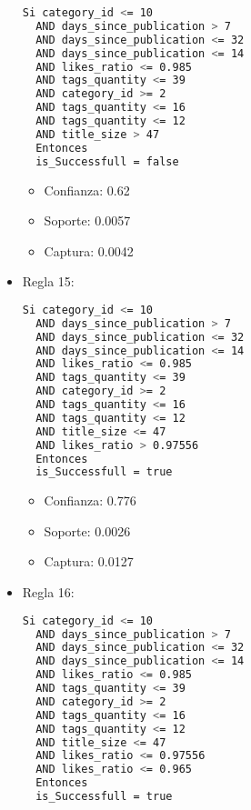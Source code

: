 \begin{itemize}
\begin{lstlisting}[language=bash, numbers=none]
  Si category_id <= 10
  AND days_since_publication > 7
  AND days_since_publication <= 32
  AND days_since_publication <= 14
  AND likes_ratio <= 0.985
  AND tags_quantity <= 39
  AND category_id >= 2
  AND tags_quantity <= 16
  AND tags_quantity <= 12
  AND title_size > 47
  Entonces
  is_Successfull = false
\end{lstlisting}

    \begin{itemize}
      \item Confianza: 0.62
      \item Soporte: 0.0057
      \item Captura: 0.0042
    \end{itemize}

  \item Regla 15:

\begin{lstlisting}[language=bash, numbers=none]
  Si category_id <= 10
  AND days_since_publication > 7
  AND days_since_publication <= 32
  AND days_since_publication <= 14
  AND likes_ratio <= 0.985
  AND tags_quantity <= 39
  AND category_id >= 2
  AND tags_quantity <= 16
  AND tags_quantity <= 12
  AND title_size <= 47
  AND likes_ratio > 0.97556
  Entonces
  is_Successfull = true
\end{lstlisting}

    \begin{itemize}
      \item Confianza: 0.776
      \item Soporte: 0.0026
      \item Captura: 0.0127
    \end{itemize}

  \item Regla 16:

\begin{lstlisting}[language=bash, numbers=none]
  Si category_id <= 10
  AND days_since_publication > 7
  AND days_since_publication <= 32
  AND days_since_publication <= 14
  AND likes_ratio <= 0.985
  AND tags_quantity <= 39
  AND category_id >= 2
  AND tags_quantity <= 16
  AND tags_quantity <= 12
  AND title_size <= 47
  AND likes_ratio <= 0.97556
  AND likes_ratio <= 0.965
  Entonces
  is_Successfull = true
\end{lstlisting}


\end{itemize}
